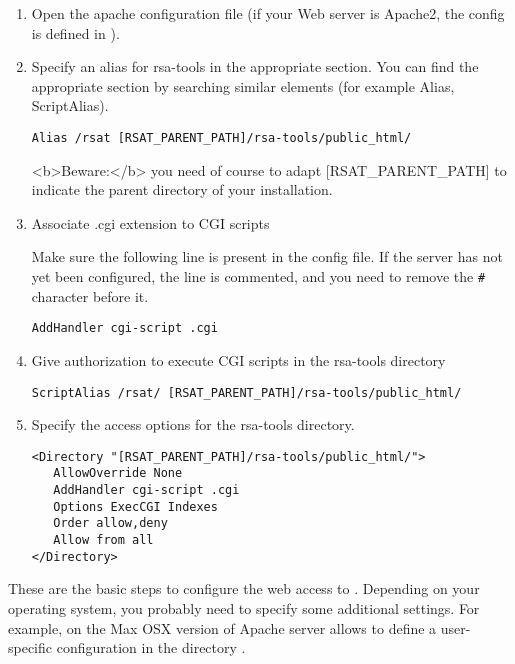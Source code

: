 \documentclass[12pt,a4paper, twoside]{scrreprt} %
\begin{document}
\begin{enumerate}
\item Open the apache configuration file (if your Web server is
  Apache2, the config is defined in ).

\item Specify an alias for rsa-tools in the appropriate section. You
  can find the appropriate section by searching similar elements (for
  example Alias, ScriptAlias).

\begin{lstlisting}
Alias /rsat [RSAT_PARENT_PATH]/rsa-tools/public_html/
\end{lstlisting}

<b>Beware:</b> you need of course to adapt [RSAT\_PARENT\_PATH] to
indicate the parent directory of your \RSAT installation.

\item Associate .cgi extension to CGI scripts

Make sure the following line is present in the config file. If the
server has not yet been configured, the line is commented, and you
need to remove the \texttt{\#} character before it.

\begin{lstlisting}
AddHandler cgi-script .cgi
\end{lstlisting}

\item Give authorization to execute CGI scripts in the rsa-tools directory

\begin{lstlisting}
ScriptAlias /rsat/ [RSAT_PARENT_PATH]/rsa-tools/public_html/
\end{lstlisting}

\item Specify the access options for the rsa-tools directory.

\begin{lstlisting}
<Directory "[RSAT_PARENT_PATH]/rsa-tools/public_html/">
   AllowOverride None
   AddHandler cgi-script .cgi
   Options ExecCGI Indexes
   Order allow,deny
   Allow from all
</Directory>
\end{lstlisting}

\end{enumerate}

These are the basic steps to configure the web access to
\RSAT. Depending on your operating system, you probably need to
specify some additional settings. For example, on the Max OSX version
of Apache server allows to define a user-specific configuration in the
directory .
\end{document}
